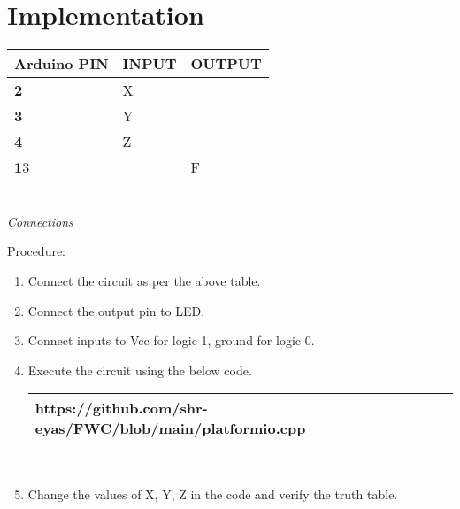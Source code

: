 \documentclass[journal,12pt]{IEEEtran}
\begin{document}
\section{Implementation}
\vspace{20pt}
\begin{center}
  \begin{tabularx}{0.46\textwidth} { 
  | >{\centering\arraybackslash}X 
  | >{\centering\arraybackslash}X 
  | >{\centering\arraybackslash}X  | }
\hline
\textbf{Arduino PIN} & \textbf{INPUT} & \textbf{OUTPUT} \\ 
\hline
\textbf 2 & X & \\
\hline
\textbf 3 & Y & \\
\hline
\textbf 4 & Z & \\
\hline
\textbf 13 & & F \\
\hline
\end{tabularx}
\vspace{6pt}
\\\textit{Connections}
\end{center}

\begin{flushleft}

Procedure:\\
\begin{enumerate}[label=\alph*.,labelindent=\parindent,leftmargin=*]
    \item Connect the circuit as per the above table.
    \vspace{2pt}
    \item Connect the output pin to LED.
    \vspace{2pt}
    \item Connect inputs to Vcc for logic 1, ground for logic 0.
    \vspace{2pt}
    \item Execute the circuit using the below code.
    \\
    \vspace{7pt}
    \begin{tabularx}{0.52\textwidth} { 
    | >{\centering\arraybackslash}X |}
    \hline
    https://github.com/shr-eyas/FWC/blob/main/platformio.cpp\\
    \hline
    \end{tabularx}
    \\
    \vspace{10pt}
    \item Change the values of X, Y, Z in the code and verify the truth table.\\
    
\end{enumerate}
\end{flushleft}


\end{document}
